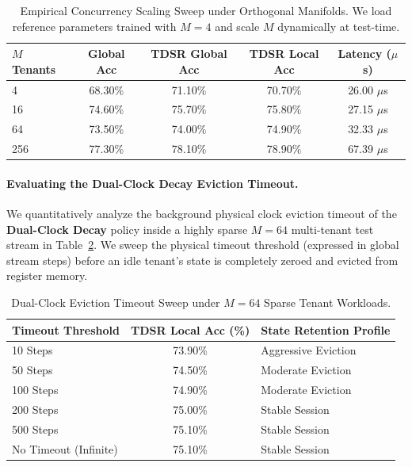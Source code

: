 \begin{table}[ht]
\caption{Empirical Concurrency Scaling Sweep under Orthogonal Manifolds. We load reference parameters trained with $M=4$ and scale $M$ dynamically at test-time.}
\label{tab:scaling_sweep}
\vskip 0.15in
\begin{center}
\begin{small}
\begin{sc}
\begin{tabular}{lcccc}
\toprule
$M$ Tenants & Global Acc & TDSR Global Acc & TDSR Local Acc & Latency ($\mu$s) \\
\midrule
4 & 68.30\% & 71.10\% & 70.70\% & 26.00 $\mu$s \\
16 & 74.60\% & 75.70\% & 75.80\% & 27.15 $\mu$s \\
64 & 73.50\% & 74.00\% & 74.90\% & 32.33 $\mu$s \\
256 & 77.30\% & 78.10\% & 78.90\% & 67.39 $\mu$s \\
\bottomrule
\end{tabular}
\end{sc}
\end{small}
\end{center}
\vskip -0.1in
\end{table}

\paragraph{Evaluating the Dual-Clock Decay Eviction Timeout.}
We quantitatively analyze the background physical clock eviction timeout of the \textbf{Dual-Clock Decay} policy inside a highly sparse $M=64$ multi-tenant test stream in Table~\ref{tab:timeout_sweep}. We sweep the physical timeout threshold (expressed in global stream steps) before an idle tenant's state is completely zeroed and evicted from register memory.

\begin{table}[ht]
\caption{Dual-Clock Eviction Timeout Sweep under $M=64$ Sparse Tenant Workloads.}
\label{tab:timeout_sweep}
\vskip 0.15in
\begin{center}
\begin{small}
\begin{sc}
\begin{tabular}{lcl}
\toprule
Timeout Threshold & TDSR Local Acc (\%) & State Retention Profile \\
\midrule
10 Steps & 73.90\% & Aggressive Eviction \\
50 Steps & 74.50\% & Moderate Eviction \\
100 Steps & 74.90\% & Moderate Eviction \\
200 Steps & 75.00\% & Stable Session \\
500 Steps & 75.10\% & Stable Session \\
No Timeout (Infinite) & 75.10\% & Stable Session \\
\bottomrule
\end{tabular}
\end{sc}
\end{small}
\end{center}
\vskip -0.1in
\end{table}

